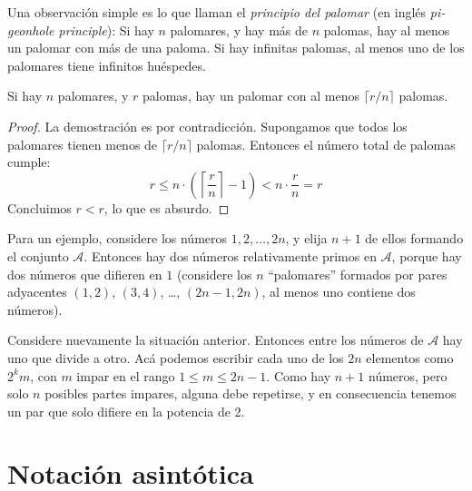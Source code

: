  Una observación simple
  es lo que llaman el \emph{principio del palomar}%
  (en inglés
    \emph{\foreignlanguage{english}{pigeonhole principle}}):%
  Si hay \(n\) palomares,
  y hay más de \(n\) palomas,
  hay al menos un palomar con más de una paloma.
  Si hay infinitas palomas,
  al menos uno de los palomares tiene infinitos huéspedes.
  \begin{theorem}
    \label{theo:pigeonhole}
    Si hay \(n\) palomares,
    y \(r\) palomas,
    hay un palomar con al menos \(\lceil r / n \rceil\) palomas.
  \end{theorem}
  \begin{proof}
    La demostración es por contradicción.
    Supongamos que todos los palomares
    tienen menos de \(\lceil r / n \rceil\) palomas.
    Entonces el número total de palomas cumple:
    \begin{equation*}
      r
	\le n \cdot \left(
		      \left\lceil \frac{r}{n} \right\rceil - 1
		    \right)
	< n \cdot \frac{r}{n}
	= r
    \end{equation*}
    Concluimos \(r < r\),
    lo que es absurdo.
  \end{proof}

  Para un ejemplo,
  considere los números \(1, 2, \dotsc, 2 n\),
  y elija \(n + 1\) de ellos formando el conjunto \(\mathcal{A}\).
  Entonces hay dos números relativamente primos en \(\mathcal{A}\),
  porque hay dos números que difieren en \(1\)
  (considere los \(n\) ``palomares''
   formados por pares adyacentes
   \((1, 2)\), \((3, 4)\), \ldots, \((2 n - 1, 2 n)\),
   al menos uno contiene dos números).

  Considere nuevamente la situación anterior.
  Entonces entre los números de \(\mathcal{A}\)
  hay uno que divide a otro.
  Acá podemos escribir cada uno de los \(2 n\) elementos
  como \(2^k m\),
  con \(m\) impar en el rango \(1 \le m \le 2 n - 1\).
  Como hay \(n + 1\) números,
  pero solo \(n\) posibles partes impares,
  alguna debe repetirse,
  y en consecuencia
  tenemos un par que solo difiere en la potencia de 2.

\section{Notación asintótica}
\label{sec:notacion-asintotica}

